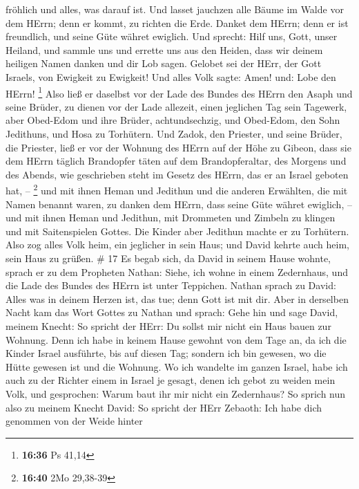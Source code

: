 fröhlich und alles, was darauf ist.  Und lasset jauchzen
alle Bäume im Walde vor dem HErrn; denn er kommt, zu richten die Erde.
 Danket dem HErrn; denn er ist freundlich, und seine Güte
währet ewiglich.  Und sprecht: Hilf uns, Gott, unser
Heiland, und sammle uns und errette uns aus den Heiden, dass wir deinem
heiligen Namen danken und dir Lob sagen.  Gelobet sei der
HErr, der Gott Israels, von Ewigkeit zu Ewigkeit! Und alles Volk sagte:
Amen! und: Lobe den HErrn! \footnote{\textbf{16:36} Ps 41,14}
 Also ließ er daselbst vor der Lade des Bundes des HErrn
den Asaph und seine Brüder, zu dienen vor der Lade allezeit, einen
jeglichen Tag sein Tagewerk,  aber Obed-Edom und ihre
Brüder, achtundsechzig, und Obed-Edom, den Sohn Jedithuns, und Hosa zu
Torhütern.  Und Zadok, den Priester, und seine Brüder, die
Priester, ließ er vor der Wohnung des HErrn auf der Höhe zu Gibeon,
 dass sie dem HErrn täglich Brandopfer täten auf dem
Brandopferaltar, des Morgens und des Abends, wie geschrieben steht im
Gesetz des HErrn, das er an Israel geboten hat, -- \footnote{\textbf{16:40}
  2Mo 29,38-39}  und mit ihnen Heman und Jedithun und die
anderen Erwählten, die mit Namen benannt waren, zu danken dem HErrn,
dass seine Güte währet ewiglich, --  und mit ihnen Heman
und Jedithun, mit Drommeten und Zimbeln zu klingen und mit Saitenspielen
Gottes. Die Kinder aber Jedithun machte er zu Torhütern. 
Also zog alles Volk heim, ein jeglicher in sein Haus; und David kehrte
auch heim, sein Haus zu grüßen. \# 17  Es begab sich, da
David in seinem Hause wohnte, sprach er zu dem Propheten Nathan: Siehe,
ich wohne in einem Zedernhaus, und die Lade des Bundes des HErrn ist
unter Teppichen.  Nathan sprach zu David: Alles was in
deinem Herzen ist, das tue; denn Gott ist mit dir.  Aber in
derselben Nacht kam das Wort Gottes zu Nathan und sprach: 
Gehe hin und sage David, meinem Knecht: So spricht der HErr: Du sollst
mir nicht ein Haus bauen zur Wohnung.  Denn ich habe in
keinem Hause gewohnt von dem Tage an, da ich die Kinder Israel
ausführte, bis auf diesen Tag; sondern ich bin gewesen, wo die Hütte
gewesen ist und die Wohnung.  Wo ich wandelte im ganzen
Israel, habe ich auch zu der Richter einem in Israel je gesagt, denen
ich gebot zu weiden mein Volk, und gesprochen: Warum baut ihr mir nicht
ein Zedernhaus?  So sprich nun also zu meinem Knecht David:
So spricht der HErr Zebaoth: Ich habe dich genommen von der Weide hinter
